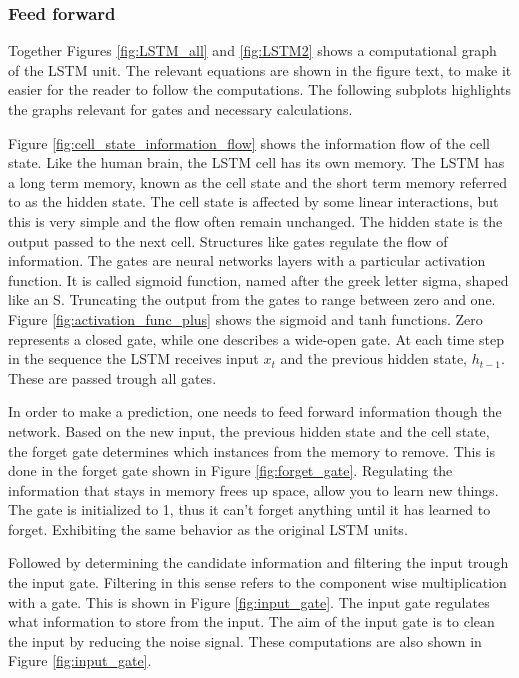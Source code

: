 \documentclass{article}
\begin{document}
\subsubsection{Feed forward} \label{sec:forward_pass_lstm}


Together Figures \ref{fig:LSTM_all} and \ref{fig:LSTM2} shows a computational graph of the LSTM unit. The relevant equations are shown in the figure text, to make it easier for the reader to follow the computations. The following subplots highlights the graphs relevant for gates and necessary calculations. %

Figure  \ref{fig:cell_state_information_flow} shows the information flow of the cell state. Like the human brain, the LSTM cell has its own memory. The LSTM has a long term memory, known as the cell state and the short term memory referred to as the hidden state. The cell state is affected by some linear interactions, but this is very simple and the flow often remain unchanged. The hidden state is the output passed to the next cell. Structures like gates regulate the flow of information. The gates are neural networks layers with a particular activation function. It is called sigmoid function, named after the greek letter sigma, shaped like an S. Truncating the output from the gates to range between zero and one. Figure \ref{fig:activation_func_plus} shows the sigmoid and tanh functions. Zero represents a closed gate, while one describes a wide-open gate. At each time step in the sequence the LSTM receives input $x_t$ and the previous hidden state, $h_{t-1}$. These are passed trough all gates. 

In order to make a prediction, one needs to feed forward information though the network. Based on the new input, the previous hidden state and the cell state, the forget gate determines which instances from the memory to remove. This is done in the forget gate shown in Figure \ref{fig:forget_gate}. Regulating the information that stays in memory frees up space, allow you to learn new things. The gate is initialized to 1, thus it can't forget anything until it has learned to forget. Exhibiting the same behavior as the original LSTM units. 

Followed by determining the candidate information and filtering the input trough the input gate. Filtering in this sense refers to the component wise multiplication with a gate. This is shown in Figure \ref{fig:input_gate}.  The input gate regulates what information to store from the input. The aim of the input gate is to clean the input by reducing the noise signal. %
These computations are also shown in Figure \ref{fig:input_gate}.
\end{document}
